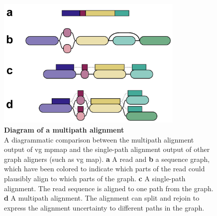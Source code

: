 \documentclass[11pt]{ucthesis}
\begin{document}
\begin{figure}[H]
\ssp
\begin{center}
\includegraphics[width=0.8\textwidth]{mpmapfigures/figureS10.pdf}
\caption{\textbf{Diagram of a multipath alignment} \\
A diagrammatic comparison between the multipath alignment output of vg mpmap and the single-path alignment output of other graph aligners (such as vg map). \textbf{a} A read and \textbf{b} a sequence graph, which have been colored to indicate which parts of the read could plausibly align to which parts of the graph. \textbf{c} A single-path alignment. The read sequence is aligned to one path from the graph. \textbf{d} A multipath alignment. The alignment can split and rejoin to express the alignment uncertainty to different paths in the graph.
} \label{fig:multipath-alignment}
\end{center}
\end{figure}
\end{document}
